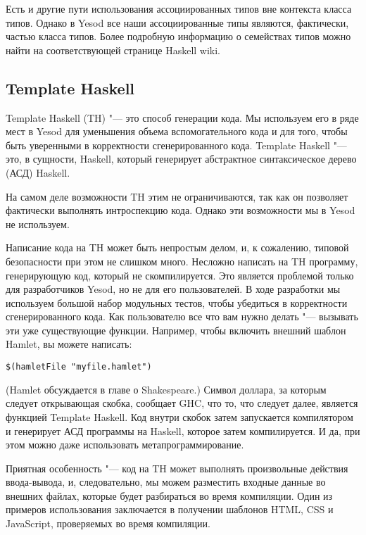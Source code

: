 Есть и другие пути использования ассоциированных типов вне контекста класса типов. Однако в Yesod все наши ассоциированные типы являются, фактически, частью класса типов. Более подробную информацию о семействах типов можно найти на соответствующей странице Haskell wiki.

\subsection{Template Haskell}

Template Haskell (TH) "--- это способ генерации кода. Мы используем его в ряде мест в Yesod для уменьшения объема вспомогательного кода и для того, чтобы быть уверенными в корректности сгенерированного кода. Template Haskell "--- это, в сущности, Haskell, который генерирует абстрактное синтаксическое дерево (АСД) Haskell.

На самом деле возможности TH этим не ограничиваются, так как он позволяет фактически выполнять интроспекцию кода. Однако эти возможности мы в Yesod не используем.

Написание кода на TH может быть непростым делом, и, к сожалению, типовой безопасности при этом не слишком много. Несложно написать на TH программу, генерирующую код, который не скомпилируется. Это является проблемой только для разработчиков Yesod, но не для его пользователей. В ходе разработки мы используем большой набор модульных тестов, чтобы убедиться в корректности сгенерированного кода. Как пользователю все что вам нужно делать "--- вызывать эти уже существующие функции. Например, чтобы включить внешний шаблон Hamlet, вы можете написать:

\begin{lstlisting}
$(hamletFile "myfile.hamlet")
\end{lstlisting}

(Hamlet обсуждается в главе о Shakespeare.) Символ доллара, за которым следует открывающая скобка, сообщает GHC, что то, что следует далее, является функцией Template Haskell. Код внутри скобок затем запускается компилятором и генерирует АСД программы на Haskell, которое затем компилируется. И да, при этом можно даже использовать метапрограммирование.

Приятная особенность "--- код на TH может выполнять произвольные действия ввода-вывода, и, следовательно, мы можем разместить входные данные во внешних файлах, которые будет разбираться во время компиляции. Один из примеров использования заключается в получении шаблонов HTML, CSS и JavaScript, проверяемых во время компиляции.

